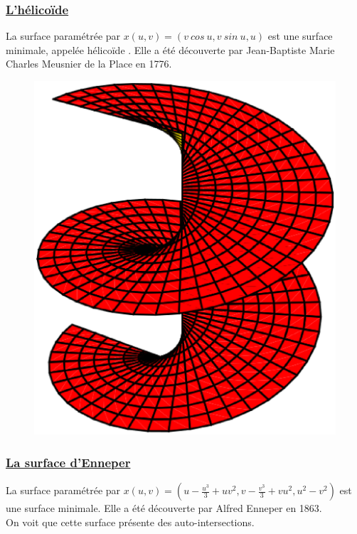 \documentclass {report}
\begin{document}
\subsubsection[L'hélicoïde]{\uline{L'hélicoïde}}

La surface paramétrée par $x(u,v) = (v\ cos\ u, v\ sin\ u, u)$ est une surface minimale, appelée hélicoïde . Elle a été découverte par Jean-Baptiste Marie Charles Meusnier de la Place en 1776.

\begin{figure}[h!]
      \centering 
      \includegraphics[scale=0.25]{Images_Fichiers/4.eps}
\end{figure}

\subsubsection[La surface d'Enneper]{\uline{La surface d'Enneper}}

La surface paramétrée par $x(u,v) = \left(u - \frac{u^3}{3} + u v^2, v-{\frac {v^{3}}{3}}+vu^{2}, u^2-v^2\right)$ est une surface minimale. Elle a été découverte par Alfred Enneper en 1863. \\On voit que cette surface présente des auto-intersections.
\end{document}
